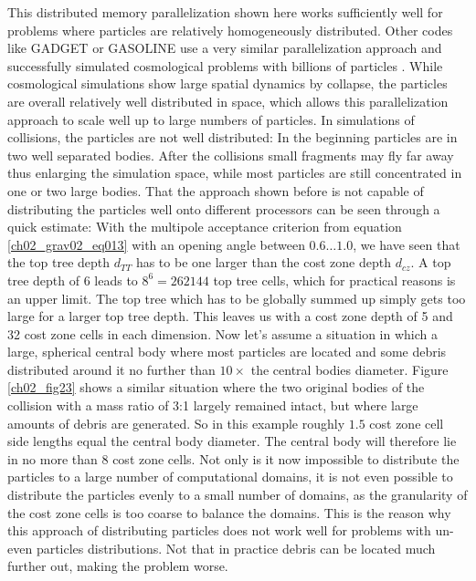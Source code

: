 This distributed memory parallelization shown here works sufficiently well for problems where particles are  relatively homogeneously distributed. Other codes like GADGET or GASOLINE use a very similar parallelization approach and successfully simulated cosmological problems with billions of particles \cite{2005Natur.435..629S}. While cosmological simulations show large spatial dynamics by collapse, the particles are overall relatively well distributed in space, which allows this parallelization approach to scale well up to large numbers of particles. In simulations of collisions, the particles are not well distributed: In the beginning particles are in two well separated bodies. After the collisions small fragments may fly far away thus enlarging the simulation space, while most particles are still concentrated in one or two large bodies. That the approach shown before is not capable of distributing the particles well onto different processors can be seen through a quick estimate: With the multipole acceptance criterion from equation \ref{ch02_grav02_eq013} with an opening angle between $0.6 \dots 1.0 $, we have seen that the top tree depth $d_{TT}$ has to be one larger than the cost zone depth $d_{cz}$. A top tree depth of 6 leads to $8^6 = 262144$ top tree cells, which for practical reasons is an upper limit. The top tree which has to be globally summed up simply gets too large for a larger top tree depth. This leaves us with a cost zone depth of 5 and 32 cost zone cells in each dimension. Now let's assume a situation in which a large, spherical central body where most particles are located and some debris distributed around it no further than $10 \times$ the central bodies diameter. Figure \ref{ch02_fig23} shows a similar situation where the two original bodies of the collision with a mass ratio of 3:1 largely remained intact, but where large amounts of debris are generated. So in this example roughly $1.5$ cost zone cell side lengths equal the central body diameter. The central body will therefore lie in no more than 8 cost zone cells. Not only is it now impossible to distribute the particles to a large number of computational domains, it is not even possible to distribute the particles evenly to a small number of domains, as the granularity of the cost zone cells is too coarse to balance the domains. This is the reason why this approach of distributing particles does not work well for problems with un-even particles distributions. Not that in practice debris can be located much further out, making the problem worse.

